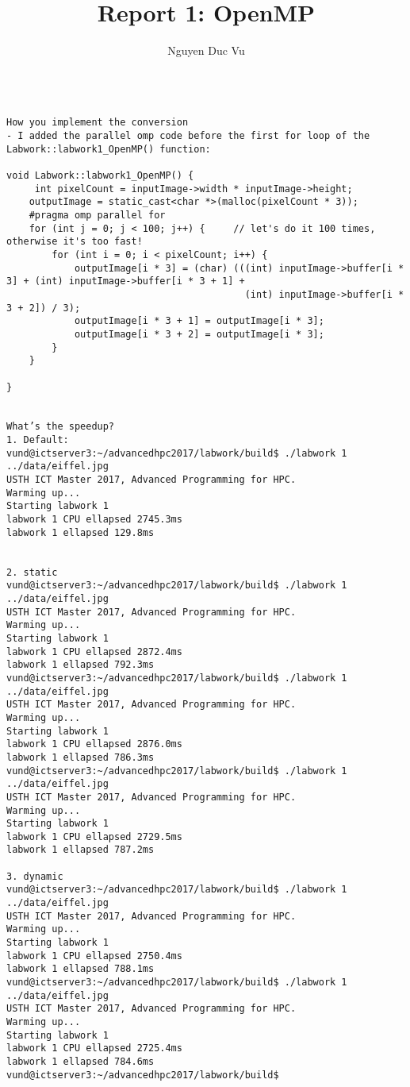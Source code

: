 \documentclass{report}
\title{Report 1: OpenMP}
\author{Nguyen Duc Vu}
\begin{document}
\maketitle

\begin{section}


\begin{verbatim}

How you implement the conversion
- I added the parallel omp code before the first for loop of the Labwork::labwork1_OpenMP() function:

void Labwork::labwork1_OpenMP() {
     int pixelCount = inputImage->width * inputImage->height;
    outputImage = static_cast<char *>(malloc(pixelCount * 3));
    #pragma omp parallel for
    for (int j = 0; j < 100; j++) {     // let's do it 100 times, otherwise it's too fast!
        for (int i = 0; i < pixelCount; i++) {
            outputImage[i * 3] = (char) (((int) inputImage->buffer[i * 3] + (int) inputImage->buffer[i * 3 + 1] +
                                          (int) inputImage->buffer[i * 3 + 2]) / 3);
            outputImage[i * 3 + 1] = outputImage[i * 3];
            outputImage[i * 3 + 2] = outputImage[i * 3];
        }
    }   

}


What’s the speedup?
1. Default:
vund@ictserver3:~/advancedhpc2017/labwork/build$ ./labwork 1 ../data/eiffel.jpg
USTH ICT Master 2017, Advanced Programming for HPC.
Warming up...
Starting labwork 1
labwork 1 CPU ellapsed 2745.3ms
labwork 1 ellapsed 129.8ms


2. static
vund@ictserver3:~/advancedhpc2017/labwork/build$ ./labwork 1 ../data/eiffel.jpg 
USTH ICT Master 2017, Advanced Programming for HPC.
Warming up...
Starting labwork 1
labwork 1 CPU ellapsed 2872.4ms
labwork 1 ellapsed 792.3ms
vund@ictserver3:~/advancedhpc2017/labwork/build$ ./labwork 1 ../data/eiffel.jpg 
USTH ICT Master 2017, Advanced Programming for HPC.
Warming up...
Starting labwork 1
labwork 1 CPU ellapsed 2876.0ms
labwork 1 ellapsed 786.3ms
vund@ictserver3:~/advancedhpc2017/labwork/build$ ./labwork 1 ../data/eiffel.jpg 
USTH ICT Master 2017, Advanced Programming for HPC.
Warming up...
Starting labwork 1
labwork 1 CPU ellapsed 2729.5ms
labwork 1 ellapsed 787.2ms

3. dynamic
vund@ictserver3:~/advancedhpc2017/labwork/build$ ./labwork 1 ../data/eiffel.jpg 
USTH ICT Master 2017, Advanced Programming for HPC.
Warming up...
Starting labwork 1
labwork 1 CPU ellapsed 2750.4ms
labwork 1 ellapsed 788.1ms
vund@ictserver3:~/advancedhpc2017/labwork/build$ ./labwork 1 ../data/eiffel.jpg 
USTH ICT Master 2017, Advanced Programming for HPC.
Warming up...
Starting labwork 1
labwork 1 CPU ellapsed 2725.4ms
labwork 1 ellapsed 784.6ms
vund@ictserver3:~/advancedhpc2017/labwork/build$ 



\end{verbatim}
\end{section}
\end{document}
